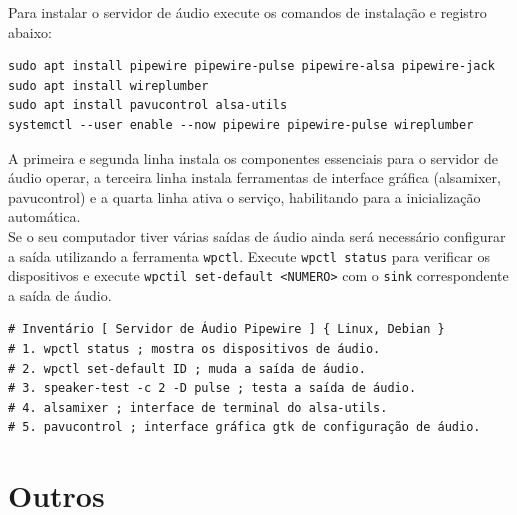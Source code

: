 \documentclass[12pt,a4paper]{article}
\begin{document}
\vspace{\baselineskip}

Para instalar o servidor de áudio execute os comandos de instalação e registro abaixo:\\

\begin{lstlisting}
sudo apt install pipewire pipewire-pulse pipewire-alsa pipewire-jack 
sudo apt install wireplumber
sudo apt install pavucontrol alsa-utils 
systemctl --user enable --now pipewire pipewire-pulse wireplumber
\end{lstlisting}

\vspace{\baselineskip}

A primeira e segunda linha instala os componentes essenciais para o servidor de áudio operar, a terceira linha instala ferramentas de interface gráfica (alsamixer, pavucontrol) e a quarta linha ativa o serviço, habilitando para a inicialização automática. \\

Se o seu computador tiver várias saídas de áudio ainda será necessário configurar a saída utilizando a ferramenta \texttt{wpctl}. Execute \texttt{wpctl status} para verificar os dispositivos e execute \texttt{wpctil set-default <NUMERO>} com o \texttt{sink} correspondente a saída de áudio. \\

\begin{lstlisting}
# Inventário [ Servidor de Áudio Pipewire ] { Linux, Debian }
# 1. wpctl status ; mostra os dispositivos de áudio.
# 2. wpctl set-default ID ; muda a saída de áudio.
# 3. speaker-test -c 2 -D pulse ; testa a saída de áudio.
# 4. alsamixer ; interface de terminal do alsa-utils.
# 5. pavucontrol ; interface gráfica gtk de configuração de áudio.
\end{lstlisting}


\section{Outros}
\end{document}
